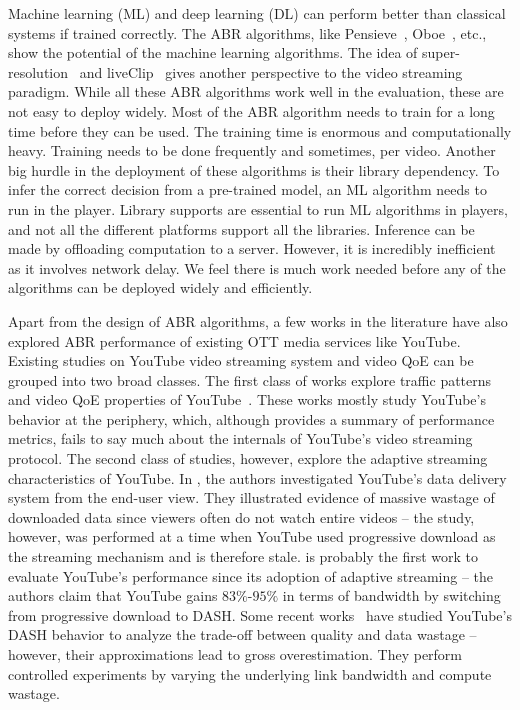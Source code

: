 Machine learning (ML) and deep learning (DL) can perform better than classical systems if trained correctly. The ABR algorithms, like Pensieve~\cite{mao2017neural}, Oboe~\cite{Akhtar2018}, etc., show the potential of the machine learning algorithms. The idea of super-resolution~\cite{9155384} and liveClip~\cite{10.1145/3386290.3396937} gives another perspective to the video streaming paradigm. While all these ABR algorithms work well in the evaluation, these are not easy to deploy widely. Most of the ABR algorithm needs to train for a long time before they can be used. The training time is enormous and computationally heavy. Training needs to be done frequently and sometimes, per video. Another big hurdle in the deployment of these algorithms is their library dependency. To infer the correct decision from a pre-trained model, an ML algorithm needs to run in the player. Library supports are essential to run ML algorithms in players, and not all the different platforms support all the libraries. Inference can be made by offloading computation to a server. However, it is incredibly inefficient as it involves network delay. We feel there is much work needed before any of the algorithms can be deployed widely and efficiently.

Apart from the design of ABR algorithms, a few works in the literature have also explored ABR performance of existing OTT media services like YouTube. Existing studies on YouTube video streaming system and video QoE can be grouped into two broad classes. The first class of works explore traffic patterns and video QoE properties of YouTube~\cite{gill2007youtube,krishnappa2013dashing,wamser2016modeling,wamser2015poster,6757893ieeeexp,7129790ieeeexp}. These works mostly study YouTube's behavior at the periphery, which, although provides a summary of performance metrics, fails to say much about the internals of YouTube's video streaming protocol. The second class of studies, however, explore the adaptive streaming characteristics of YouTube. In \cite{finamore2011youtube}, the authors investigated YouTube's data delivery system from the end-user view. They illustrated evidence of massive wastage of downloaded data since viewers often do not watch entire videos -- the study, however, was performed at a time when YouTube used progressive download as the streaming mechanism and is therefore stale. \cite{krishnappa2013dashing} is probably the first work to evaluate YouTube's performance since its adoption of adaptive streaming -- the authors claim that YouTube gains $83\%$-$95\%$ in terms of bandwidth by switching from progressive download to DASH. Some recent works~\cite{sieber2015cost,seufert2015youtube,sieber2016sacrificing} have studied YouTube's DASH behavior to analyze the trade-off between quality and data wastage -- however, their approximations lead to gross overestimation. They perform controlled experiments by varying the underlying link bandwidth and compute wastage.

